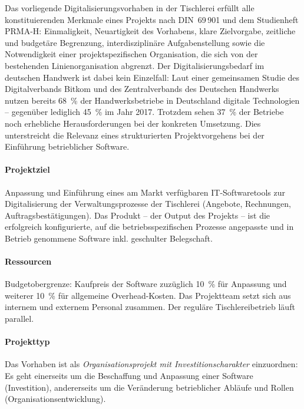 \documentclass[
    a4paper,
    11pt,
    bibliography=totoc,
    listof=totoc,
    parskip=half,
    headings=normal
]{scrbook}
\begin{document}
Das vorliegende Digitalisierungsvorhaben in der Tischlerei erfüllt alle konstituierenden
Merkmale eines Projekts nach DIN~69\,901 und dem Studienheft PRMA-H\autocite[vgl.][Kap.~1]{Mayer2014}: Einmaligkeit, Neuartigkeit des Vorhabens,
klare Zielvorgabe, zeitliche und budgetäre Begrenzung, interdisziplinäre
Aufgabenstellung sowie die Notwendigkeit einer projektspezifischen Organisation,
die sich von der bestehenden Linienorganisation abgrenzt. Der Digitalisierungsbedarf
im deutschen Handwerk ist dabei kein Einzelfall: Laut einer gemeinsamen Studie des
Digitalverbands Bitkom und des Zentralverbands des Deutschen Handwerks nutzen
bereits 68~\% der Handwerksbetriebe in Deutschland digitale Technologien --
gegenüber lediglich 45~\% im Jahr 2017\autocite[vgl.][]{BitkomZDH2023}. Trotzdem
sehen 37~\% der Betriebe noch erhebliche Herausforderungen bei der konkreten
Umsetzung. Dies unterstreicht die Relevanz eines strukturierten Projektvorgehens
bei der Einführung betrieblicher Software.

\paragraph{Projektziel}
Anpassung und Einführung eines am Markt verfügbaren IT-Softwaretools zur
Digitalisierung der Verwaltungsprozesse der Tischlerei (Angebote, Rechnungen,
Auftragsbestätigungen). Das Produkt -- der Output des Projekts -- ist die erfolgreich
konfigurierte, auf die betriebsspezifischen Prozesse angepasste und in Betrieb
genommene Software inkl. geschulter Belegschaft.

\paragraph{Ressourcen}
Budgetobergrenze: Kaufpreis der Software zuzüglich 10~\% für Anpassung und
weiterer 10~\% für allgemeine Overhead-Kosten. Das Projektteam setzt sich aus
internem und externem Personal zusammen. Der reguläre Tischlereibetrieb läuft
parallel.

\paragraph{Projekttyp}
Das Vorhaben ist als \textit{Organisationsprojekt mit Investitionscharakter}
einzuordnen\autocite[vgl.][Kap.~1]{Mayer2014}: Es geht einerseits um die
Beschaffung und Anpassung einer Software (Investition), andererseits um die
Veränderung betrieblicher Abläufe und Rollen (Organisationsentwicklung).
\end{document}
